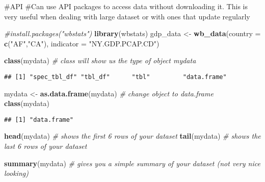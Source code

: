 \documentclass[
]{article}
\newenvironment{Shaded}{\begin{snugshade}}{\end{snugshade}}
\newcommand{\AttributeTok}[1]{\textcolor[rgb]{0.13,0.29,0.53}{#1}}
\newcommand{\CommentTok}[1]{\textcolor[rgb]{0.56,0.35,0.01}{\textit{#1}}}
\newcommand{\FunctionTok}[1]{\textcolor[rgb]{0.13,0.29,0.53}{\textbf{#1}}}
\newcommand{\NormalTok}[1]{#1}
\newcommand{\OtherTok}[1]{\textcolor[rgb]{0.56,0.35,0.01}{#1}}
\newcommand{\StringTok}[1]{\textcolor[rgb]{0.31,0.60,0.02}{#1}}
\begin{document}
\#API \#Can use API packages to access data without downloading it. This
is very useful when dealing with large dataset or with ones that update
regularly

\begin{Shaded}
\begin{Highlighting}[]
\CommentTok{\#install.packages("wbstats")}
\FunctionTok{library}\NormalTok{(wbstats)}
\NormalTok{gdp\_data }\OtherTok{\textless{}{-}} \FunctionTok{wb\_data}\NormalTok{(}\AttributeTok{country =} \FunctionTok{c}\NormalTok{(}\StringTok{"AF"}\NormalTok{,}\StringTok{"CA"}\NormalTok{), }\AttributeTok{indicator =} \StringTok{"NY.GDP.PCAP.CD"}\NormalTok{)}
\end{Highlighting}
\end{Shaded}

\begin{Shaded}
\begin{Highlighting}[]
\FunctionTok{class}\NormalTok{(mydata)   }\CommentTok{\# class will show us the type of object \textquotesingle{}mydata\textquotesingle{}}
\end{Highlighting}
\end{Shaded}

\begin{verbatim}
## [1] "spec_tbl_df" "tbl_df"      "tbl"         "data.frame"
\end{verbatim}

\begin{Shaded}
\begin{Highlighting}[]
\NormalTok{mydata }\OtherTok{\textless{}{-}} \FunctionTok{as.data.frame}\NormalTok{(mydata)   }\CommentTok{\# change object to data.frame}
\FunctionTok{class}\NormalTok{(mydata)}
\end{Highlighting}
\end{Shaded}

\begin{verbatim}
## [1] "data.frame"
\end{verbatim}

\begin{Shaded}
\begin{Highlighting}[]
\FunctionTok{head}\NormalTok{(mydata)     }\CommentTok{\# shows the first 6 rows of your dataset}
\FunctionTok{tail}\NormalTok{(mydata)    }\CommentTok{\# shows the last 6 rows of your dataset}
\end{Highlighting}
\end{Shaded}

\begin{Shaded}
\begin{Highlighting}[]
\FunctionTok{summary}\NormalTok{(mydata) }\CommentTok{\# gives you a simple summary of your dataset (not very nice looking)}
\end{Highlighting}
\end{Shaded}
\end{document}
